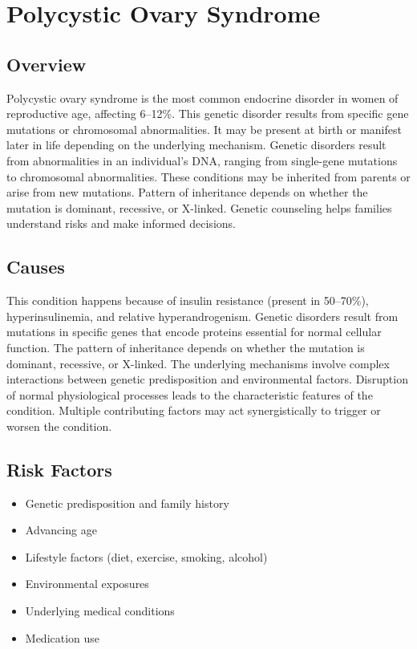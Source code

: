 \chapter{Polycystic Ovary Syndrome}
\label{sec:Polycystic Ovary Syndrome}

\section{Overview}
Polycystic ovary syndrome is the most common endocrine disorder in women of reproductive age, affecting 6--12\%. This genetic disorder results from specific gene mutations or chromosomal abnormalities. It may be present at birth or manifest later in life depending on the underlying mechanism. Genetic disorders result from abnormalities in an individual's DNA, ranging from single-gene mutations to chromosomal abnormalities. These conditions may be inherited from parents or arise from new mutations. Pattern of inheritance depends on whether the mutation is dominant, recessive, or X-linked. Genetic counseling helps families understand risks and make informed decisions.
\section{Causes}
This condition happens because of insulin resistance (present in 50--70\%), hyperinsulinemia, and relative hyperandrogenism. Genetic disorders result from mutations in specific genes that encode proteins essential for normal cellular function. The pattern of inheritance depends on whether the mutation is dominant, recessive, or X-linked. The underlying mechanisms involve complex interactions between genetic predisposition and environmental factors. Disruption of normal physiological processes leads to the characteristic features of the condition. Multiple contributing factors may act synergistically to trigger or worsen the condition.
\section{Risk Factors}


\begin{itemize}[noitemsep]
  \item Genetic predisposition and family history
  \item Advancing age
  \item Lifestyle factors (diet, exercise, smoking, alcohol)
  \item Environmental exposures
  \item Underlying medical conditions
  \item Medication use
\end{itemize}

